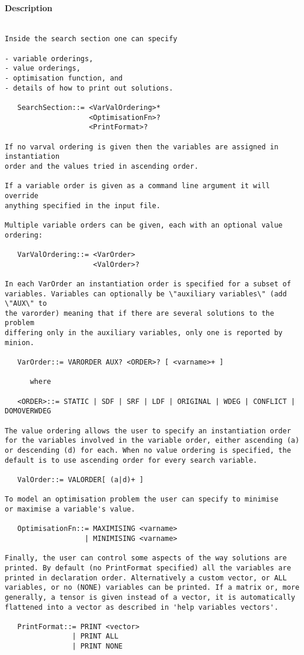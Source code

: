 \paragraph{Description}
{\footnotesize
\begin{verbatim}

Inside the search section one can specify

- variable orderings,
- value orderings,
- optimisation function, and
- details of how to print out solutions.

   SearchSection::= <VarValOrdering>*
                    <OptimisationFn>?
                    <PrintFormat>?

If no varval ordering is given then the variables are assigned in instantiation
order and the values tried in ascending order.

If a variable order is given as a command line argument it will override
anything specified in the input file.

Multiple variable orders can be given, each with an optional value ordering:

   VarValOrdering::= <VarOrder>
                     <ValOrder>?

In each VarOrder an instantiation order is specified for a subset of
variables. Variables can optionally be \"auxiliary variables\" (add \"AUX\" to
the varorder) meaning that if there are several solutions to the problem
differing only in the auxiliary variables, only one is reported by minion.

   VarOrder::= VARORDER AUX? <ORDER>? [ <varname>+ ]

      where

   <ORDER>::= STATIC | SDF | SRF | LDF | ORIGINAL | WDEG | CONFLICT |
DOMOVERWDEG

The value ordering allows the user to specify an instantiation order
for the variables involved in the variable order, either ascending (a)
or descending (d) for each. When no value ordering is specified, the
default is to use ascending order for every search variable.

   ValOrder::= VALORDER[ (a|d)+ ]

To model an optimisation problem the user can specify to minimise
or maximise a variable's value.

   OptimisationFn::= MAXIMISING <varname>
                   | MINIMISING <varname>

Finally, the user can control some aspects of the way solutions are
printed. By default (no PrintFormat specified) all the variables are
printed in declaration order. Alternatively a custom vector, or ALL
variables, or no (NONE) variables can be printed. If a matrix or, more
generally, a tensor is given instead of a vector, it is automatically
flattened into a vector as described in 'help variables vectors'.

   PrintFormat::= PRINT <vector>
                | PRINT ALL
                | PRINT NONE
\end{verbatim}
}
